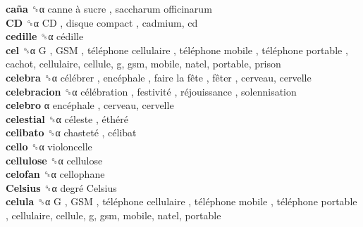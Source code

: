 \textbf{caña} ␝α   canne à sucre ,  saccharum officinarum   \\
\textbf{CD} ␝α   CD ,  disque compact , cadmium, cd  \\
\textbf{cedille} ␝α   cédille   \\
\textbf{cel} ␝α   G ,  GSM ,  téléphone cellulaire ,  téléphone mobile ,  téléphone portable , cachot, cellulaire, cellule, g, gsm, mobile, natel, portable, prison  \\
\textbf{celebra} ␝α   célébrer ,  encéphale ,  faire la fête ,  fêter , cerveau, cervelle  \\
\textbf{celebracion} ␝α   célébration ,  festivité ,  réjouissance , solennisation  \\
\textbf{celebro} α   encéphale , cerveau, cervelle  \\
\textbf{celestial} ␝α   céleste ,  éthéré   \\
\textbf{celibato} ␝α   chasteté ,  célibat   \\
\textbf{cello} ␝α  violoncelle  \\
\textbf{cellulose} ␝α  cellulose  \\
\textbf{celofan} ␝α  cellophane  \\
\textbf{Celsius} ␝α   degré Celsius   \\
\textbf{celula} ␝α   G ,  GSM ,  téléphone cellulaire ,  téléphone mobile ,  téléphone portable , cellulaire, cellule, g, gsm, mobile, natel, portable  \\
